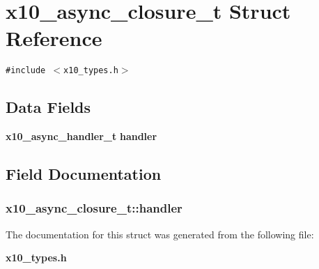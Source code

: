 \section{x10\_\-async\_\-closure\_\-t Struct Reference}
\label{structx10__async__closure__t}
{\tt \#include $<$x10\_\-types.h$>$}

\subsection*{Data Fields}
\begin{CompactItemize}
\item 
{\bf x10\_\-async\_\-handler\_\-t} {\bf handler}
\end{CompactItemize}


\subsection{Field Documentation}
\subsubsection{ {\bf x10\_\-async\_\-closure\_\-t::handler}}\label{structx10__async__closure__t_o0}




The documentation for this struct was generated from the following file:\begin{CompactItemize}
\item 
{\bf x10\_\-types.h}\end{CompactItemize}
